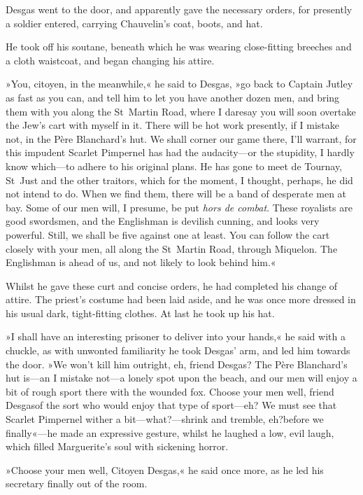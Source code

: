 Desgas went to the door, and apparently gave the necessary orders, for presently a soldier entered, carrying Chauvelin's coat, boots, and hat.

He took off his soutane, beneath which he was wearing close-fitting breeches and a cloth waistcoat, and began changing his attire.

»You, citoyen, in the meanwhile,« he said to Desgas, »go back to Captain Jutley as fast as you can, and tell him to let you have another dozen men, and bring them with you along the St~Martin Road, where I daresay you will soon overtake the Jew's cart with myself in it. There will be hot work presently, if I mistake not, in the Père Blanchard's hut. We shall corner our game there, I'll warrant, for this impudent Scarlet Pimpernel has had the audacity—or the stupidity, I hardly know which—to adhere to his original plans. He has gone to meet de Tournay, St~Just and the other traitors, which for the moment, I thought, perhaps, he did not intend to do. When we find them, there will be a band of desperate men at bay. Some of our men will, I presume, be put \textit{hors de combat}. These royalists are good swordsmen, and the Englishman is devilish cunning, and looks very powerful. Still, we shall be five against one at least. You can follow the cart closely with your men, all along the St~Martin Road, through Miquelon. The Englishman is ahead of us, and not likely to look behind him.«

Whilst he gave these curt and concise orders, he had completed his change of attire. The priest's costume had been laid aside, and he was once more dressed in his usual dark, tight-fitting clothes. At last he took up his hat.

»I shall have an interesting prisoner to deliver into your hands,« he said with a chuckle, as with unwonted familiarity he took Desgas' arm, and led him towards the door. »We won't kill him outright, eh, friend Desgas? The Père Blanchard's hut is—an I mistake not—a lonely spot upon the beach, and our men will enjoy a bit of rough sport there with the wounded fox. Choose your men well, friend Desgas\textellipsis \allowbreak  of the sort who would enjoy that type of sport—eh? We must see that Scarlet Pimpernel wither a bit—what?—shrink and tremble, eh?\textellipsis \allowbreak  before we finally\textellipsis«—he made an expressive gesture, whilst he laughed a low, evil laugh, which filled Marguerite's soul with sickening horror.

»Choose your men well, Citoyen Desgas,« he said once more, as he led his secretary finally out of the room.